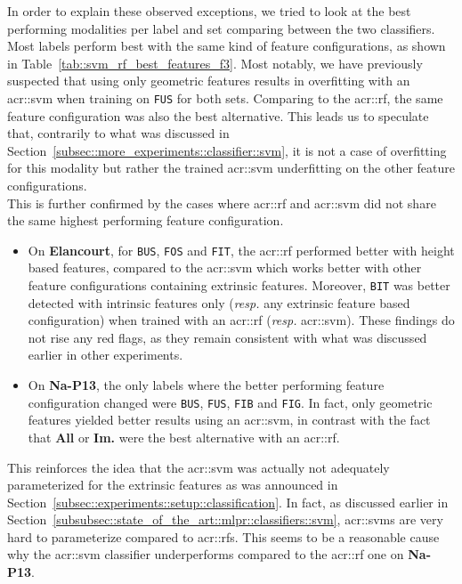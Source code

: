         In order to explain these observed exceptions, we tried to look at the best performing modalities per label and set comparing between the two classifiers.
        Most labels perform best with the same kind of feature configurations, as shown in Table~\ref{tab::svm_rf_best_features_f3}.
        Most notably, we have previously suspected that using only geometric features results in overfitting with an \gls{acr::svm} when training on \texttt{FUS} for both sets.
        Comparing to the \gls{acr::rf}, the same feature configuration was also the best alternative.
        This leads us to speculate that, contrarily to what was discussed in Section~\ref{subsec::more_experiments::classifier::svm}, it is not a case of overfitting for this modality but rather the trained \gls{acr::svm} underfitting on the other feature configurations.\\

        This is further confirmed by the cases where \gls{acr::rf} and \gls{acr::svm} did not share the same highest performing feature configuration.
        \begin{itemize}[label=\(\blacktriangleright\)]
            \item On \textbf{Elancourt}, for \texttt{BUS}, \texttt{FOS} and \texttt{FIT}, the \gls{acr::rf} performed better with height based features, compared to the \gls{acr::svm} which works better with other feature configurations containing extrinsic features.
                    Moreover, \texttt{BIT} was better detected with intrinsic features only (\textit{resp.} any extrinsic feature based configuration) when trained with an \gls{acr::rf} (\textit{resp.} \gls{acr::svm}).
                    These findings do not rise any red flags, as they remain consistent with what was discussed earlier in other experiments.
            \item On \textbf{Na-P13}, the only labels where the better performing feature configuration changed were \texttt{BUS}, \texttt{FUS}, \texttt{FIB} and \texttt{FIG}.
                    In fact, only geometric features yielded better results using an \gls{acr::svm}, in contrast with the fact that \textbf{All} or \textbf{Im.} were the best alternative with an \gls{acr::rf}.
        \end{itemize}
        This reinforces the idea that the \gls{acr::svm} was actually not adequately parameterized for the extrinsic features as was announced in Section~\ref{subsec::experiments::setup::classification}.
        In fact, as discussed earlier in Section~\ref{subsubsec::state_of_the_art::mlpr::classifiers::svm}, \glspl{acr::svm} are very hard to parameterize compared to \glspl{acr::rf}.
        This seems to be a reasonable cause why the \gls{acr::svm} classifier underperforms compared to the \gls{acr::rf} one on \textbf{Na-P13}.
            
